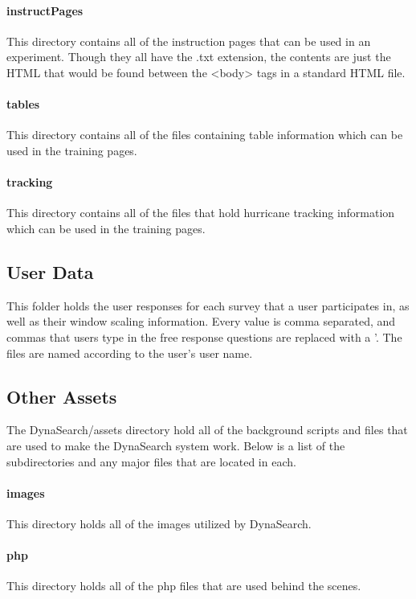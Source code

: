 \documentclass[article]{ij4uq}              %
\begin{document}
\paragraph{instructPages}
This directory contains all of the instruction pages that can be used in an experiment. Though they all have the .txt extension, the contents are just the HTML that would be found between the <body> tags in a standard HTML file. 

\paragraph{tables}
This directory contains all of the files containing table information which can be used in the training pages.

\paragraph{tracking}
This directory contains all of the files that hold hurricane tracking information which can be used in the training pages.

\subsection{User Data}
This folder holds the user responses for each survey that a user participates in, as well as their window scaling information. Every value is comma separated, and commas that users type in the free response questions are replaced with a '. The files are named according to the user's user name.

\subsection{Other Assets}
The DynaSearch/assets directory hold all of the background scripts and files that are used to make the DynaSearch system work. Below is a list of the subdirectories and any major files that are located in each.

\paragraph{images}
This directory holds all of the images utilized by DynaSearch.

\paragraph{php}
This directory holds all of the php files that are used behind the scenes.
\end{document}
